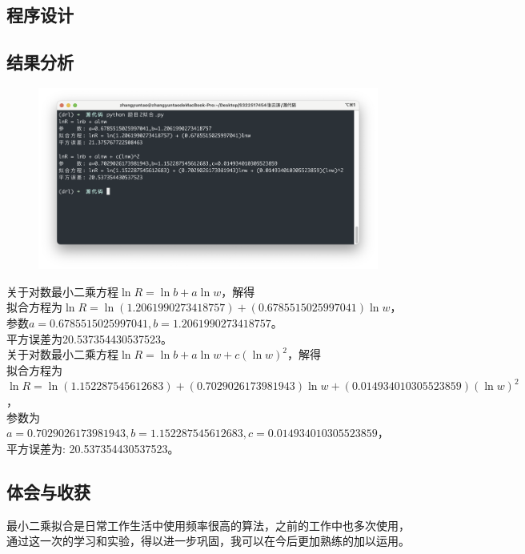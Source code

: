 \documentclass{article}
\begin{document}
\subsection{程序设计}


\subsection{结果分析}
\begin{figure}[H]
    \centering
    \includegraphics[width=\textwidth]{相关资源/图片/题目2拟合运行结果.png} 
\end{figure}
关于对数最小二乘方程$\ln R = \ln b + a\ln w$，解得 \\
拟合方程为$\ln R=\ln(1.2061990273418757)+(0.6785515025997041)\ln w$，\\
参数$a=0.6785515025997041,b=1.2061990273418757$。\\
平方误差为20.537354430537523。 \\ 

关于对数最小二乘方程$\ln R=\ln b+a\ln w+c(\ln w)^2$，解得 \\
拟合方程为$\ln R=\ln(1.152287545612683)+(0.7029026173981943)\ln w+(0.014934010305523859)(\ln w)^2$，\\
参数为$a=0.7029026173981943,b=1.152287545612683,c=0.014934010305523859$，\\
平方误差为: 20.537354430537523。

\subsection{体会与收获}
最小二乘拟合是日常工作生活中使用频率很高的算法，之前的工作中也多次使用，
通过这一次的学习和实验，得以进一步巩固，我可以在今后更加熟练的加以运用。
\end{document}
